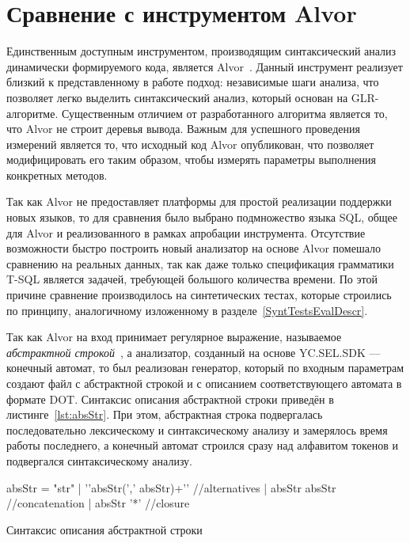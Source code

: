 \section{Сравнение с инструментом Alvor}

Единственным доступным инструментом, производящим синтаксический анализ динамически формируемого кода, является Alvor~\cite{Alvor1, Alvor2}. Данный инструмент реализует  близкий к представленному в работе подход: независимые шаги анализа, что позволяет легко выделить синтаксический анализ, который основан на GLR-алгоритме. Существенным отличием от разработанного алгоритма является то, что Alvor не строит деревья вывода. Важным для успешного проведения измерений является то, что исходный код Alvor опубликован, что позволяет модифицировать его таким образом, чтобы измерять параметры выполнения конкретных методов. 

Так как Alvor не предоставляет платформы для простой реализации поддержки новых языков, то для сравнения было выбрано подмножество языка SQL, общее для Alvor и реализованного в рамках апробации инструмента. Отсутствие возможности быстро построить новый анализатор на основе Alvor помешало сравнению на реальных данных, так как даже только спецификация грамматики T-SQL является задачей, требующей большого количества времени. По этой причине сравнение производилось на синтетических тестах, которые строились по принципу, аналогичному изложенному в разделе~\ref{SyntTestsEvalDescr}.  

Так как Alvor на вход принимает регулярное выражение, называемое \textit{абстрактной строкой}~\cite{Alvor2}, а анализатор, созданный на основе YC.SEL.SDK --- конечный автомат, то был реализован генератор, который по входным параметрам создают файл с абстрактной строкой и с описанием соответствующего автомата в формате DOT. Синтаксис описания абстрактной строки приведён в листинге~\ref{lst:absStr}. При этом, абстрактная строка подвергалась последовательно лексическому и синтаксическому анализу и замерялось время работы последнего, а конечный автомат строился сразу над алфавитом токенов и подвергался синтаксическому анализу.

\begin{listing}
    \begin{pyglist}[numbers=left,numbersep=5pt]
absStr = "str"
       | '{'absStr(',' absStr)+'}' //alternatives
       | absStr absStr             //concatenation
       | absStr '*'                //closure
\end{pyglist}
\caption{Синтаксис описания абстрактной строки}
\label{lst:absStr}
\end{listing}

